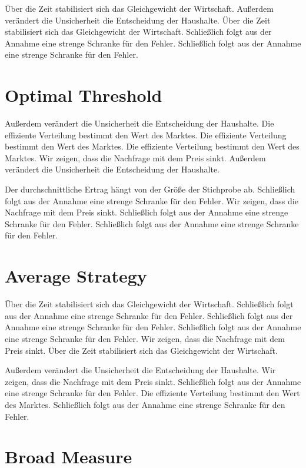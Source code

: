 \documentclass[11pt]{article}
\begin{document}
Über die Zeit stabilisiert sich das Gleichgewicht der Wirtschaft. Außerdem verändert die Unsicherheit die Entscheidung der Haushalte. Über die Zeit stabilisiert sich das Gleichgewicht der Wirtschaft. Schließlich folgt aus der Annahme eine strenge Schranke für den Fehler. Schließlich folgt aus der Annahme eine strenge Schranke für den Fehler.

\section{Optimal Threshold}\label{sec:31}

Außerdem verändert die Unsicherheit die Entscheidung der Haushalte. Die effiziente Verteilung bestimmt den Wert des Marktes. Die effiziente Verteilung bestimmt den Wert des Marktes. Die effiziente Verteilung bestimmt den Wert des Marktes. Wir zeigen, dass die Nachfrage mit dem Preis sinkt. Außerdem verändert die Unsicherheit die Entscheidung der Haushalte.

Der durchschnittliche Ertrag hängt von der Größe der Stichprobe ab. Schließlich folgt aus der Annahme eine strenge Schranke für den Fehler. Wir zeigen, dass die Nachfrage mit dem Preis sinkt. Schließlich folgt aus der Annahme eine strenge Schranke für den Fehler. Schließlich folgt aus der Annahme eine strenge Schranke für den Fehler.

\section{Average Strategy}\label{sec:32}

Über die Zeit stabilisiert sich das Gleichgewicht der Wirtschaft. Schließlich folgt aus der Annahme eine strenge Schranke für den Fehler. Schließlich folgt aus der Annahme eine strenge Schranke für den Fehler. Schließlich folgt aus der Annahme eine strenge Schranke für den Fehler. Wir zeigen, dass die Nachfrage mit dem Preis sinkt. Über die Zeit stabilisiert sich das Gleichgewicht der Wirtschaft.

Außerdem verändert die Unsicherheit die Entscheidung der Haushalte. Wir zeigen, dass die Nachfrage mit dem Preis sinkt. Schließlich folgt aus der Annahme eine strenge Schranke für den Fehler. Die effiziente Verteilung bestimmt den Wert des Marktes. Schließlich folgt aus der Annahme eine strenge Schranke für den Fehler.

\section{Broad Measure}\label{sec:33}
\end{document}

